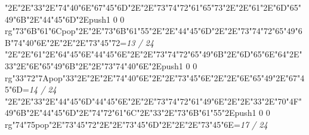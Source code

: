 \null\vfill\quad\quad\quad\ipa\char"2E\quad\quad\quad\quad\ipa\char"2E\ipa\char"33\ipa\char"2E\ipa\char"74\ipa\char"40\ipa\char"6E\bigskip\ipa\char"67\ipa\char"45\ipa\char"6D\ipa\char"2E\quad\quad\quad\ipa\char"2E\ipa\char"73\ipa\char"74\ipa\char"72\ipa\char"61\ipa\char"65\ipa\char"73\bigskip\quad\quad\ipa\char"2E\quad\quad\quad\quad\ipa\char"2E\ipa\char"61\ipa\char"2E\ipa\char"6D\ipa\char"65\ipa\char"49\ipa\char"6B\ipa\char"2E\ipa\char"44\ipa\char"45\ipa\char"6D\ipa\char"2E\pdfcolorstack\match push{1 0 0 rg}\ipa\char"73\ipa\char"6B\ipa\char"61\ipa\char"6C\pdfcolorstack\match pop{}\ipa\char"2E\quad\quad\quad\bigskip\quad\ipa\char"2E\ipa\char"73\ipa\char"6B\ipa\char"61\ipa\char"55\ipa\char"2E\quad\quad\ipa\char"2E\ipa\char"44\ipa\char"45\ipa\char"6D\ipa\char"2E\quad\quad\ipa\char"2E\ipa\char"73\ipa\char"74\ipa\char"72\ipa\char"65\ipa\char"49\ipa\char"6B\bigskip\ipa\char"74\ipa\char"40\ipa\char"6E\ipa\char"2E\quad\quad\ipa\char"2E\quad\quad\quad\ipa\char"2E\ipa\char"73\ipa\char"45\ipa\char"72\bigskip\vfill\footline={\hfill\tenrm\it 13 / 24}\eject
\null\vfill\quad\quad\quad\ipa\char"2E\quad\quad\quad\quad\ipa\char"2E\ipa\char"61\ipa\char"2E\ipa\char"64\ipa\char"45\ipa\char"6E\bigskip\ipa\char"44\ipa\char"45\ipa\char"6E\ipa\char"2E\quad\quad\quad\ipa\char"2E\ipa\char"73\ipa\char"74\ipa\char"72\ipa\char"65\ipa\char"49\ipa\char"6B\bigskip\quad\quad\ipa\char"2E\ipa\char"6D\ipa\char"65\ipa\char"6E\ipa\char"64\ipa\char"2E\ipa\char"33\ipa\char"2E\ipa\char"6E\ipa\char"65\ipa\char"49\ipa\char"6B\ipa\char"2E\quad\quad\quad\ipa\char"2E\ipa\char"73\ipa\char"74\ipa\char"40\ipa\char"6E\ipa\char"2E\pdfcolorstack\match push{1 0 0 rg}\ipa\char"33\ipa\char"72\ipa\char"7A\pdfcolorstack\match pop{}\bigskip\ipa\char"33\ipa\char"2E\quad\quad\quad\quad\ipa\char"2E\quad\quad\ipa\char"2E\ipa\char"74\ipa\char"40\ipa\char"6E\ipa\char"2E\quad\quad\ipa\char"2E\quad\quad\quad\quad\quad\quad\bigskip\ipa\char"73\ipa\char"45\ipa\char"6E\ipa\char"2E\quad\quad\ipa\char"2E\ipa\char"6E\ipa\char"65\ipa\char"49\ipa\char"2E\ipa\char"67\ipa\char"45\ipa\char"6D\bigskip\vfill\footline={\hfill\tenrm\it 14 / 24}\eject
\null\vfill\quad\quad\quad\ipa\char"2E\quad\quad\quad\quad\ipa\char"2E\ipa\char"33\ipa\char"2E\ipa\char"44\ipa\char"45\ipa\char"6D\bigskip\ipa\char"44\ipa\char"45\ipa\char"6E\ipa\char"2E\quad\quad\quad\ipa\char"2E\ipa\char"73\ipa\char"74\ipa\char"72\ipa\char"61\ipa\char"49\ipa\char"6E\bigskip\quad\quad\ipa\char"2E\quad\quad\quad\quad\ipa\char"2E\ipa\char"33\ipa\char"2E\ipa\char"70\ipa\char"4F\ipa\char"49\ipa\char"6B\ipa\char"2E\ipa\char"44\ipa\char"45\ipa\char"6D\ipa\char"2E\ipa\char"74\ipa\char"72\ipa\char"61\ipa\char"6C\ipa\char"2E\quad\quad\quad\bigskip\ipa\char"33\ipa\char"2E\ipa\char"73\ipa\char"6B\ipa\char"61\ipa\char"55\ipa\char"2E\pdfcolorstack\match push{1 0 0 rg}\ipa\char"74\ipa\char"75\pdfcolorstack\match pop{}\ipa\char"2E\ipa\char"73\ipa\char"45\ipa\char"72\ipa\char"2E\quad\quad\ipa\char"2E\quad\quad\quad\quad\quad\quad\bigskip\ipa\char"73\ipa\char"45\ipa\char"6D\ipa\char"2E\quad\quad\ipa\char"2E\quad\quad\quad\ipa\char"2E\ipa\char"73\ipa\char"45\ipa\char"6E\bigskip\vfill\footline={\hfill\tenrm\it 17 / 24}\eject
